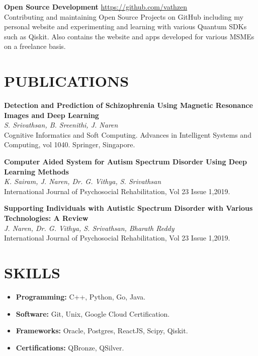 \documentclass[a4paper,9pt]{extarticle}
\begin{document}
\noindent
\textbf{Open Source Development} \hfill \url{https://github.com/vathzen}\\[1pt]
Contributing and maintaining Open Source Projects on GitHub including my personal website and experimenting and learning with various Quantum SDKs such as Qiskit. Also contains
the website and apps developed for various MSMEs on a freelance basis.

\section*{PUBLICATIONS}
\noindent
\textbf{Detection and Prediction of Schizophrenia Using Magnetic Resonance Images and Deep Learning}\\[1pt]
\textit{S. Srivathsan, B. Sreenithi, J. Naren}\\[1pt]
Cognitive Informatics and Soft Computing. Advances in Intelligent Systems and Computing, vol 1040. Springer, Singapore.

\noindent
\textbf{Computer Aided System for Autism Spectrum Disorder Using Deep Learning Methods}\\[1pt]
\textit{K. Sairam, J. Naren, Dr. G. Vithya, S. Srivathsan}\\[1pt]
International Journal of Psychosocial Rehabilitation, Vol 23 Issue 1,2019.

\noindent
\textbf{Supporting Individuals with Autistic Spectrum Disorder with Various Technologies: A Review}\\[1pt]
\textit{J. Naren, Dr. G. Vithya, S. Srivathsan, Bharath Reddy}\\[1pt]
International Journal of Psychosocial Rehabilitation, Vol 23 Issue 1,2019.

\section*{SKILLS}
\begin{itemize}
    \item \textbf{Programming:} C++, Python, Go, Java.
    \item \textbf{Software:} Git, Unix, Google Cloud Certification.
    \item \textbf{Frameworks:} Oracle, Postgres, ReactJS, Scipy, Qiskit.
    \item \textbf{Certifications:} QBronze, QSilver.
\end{itemize}
\end{document}
